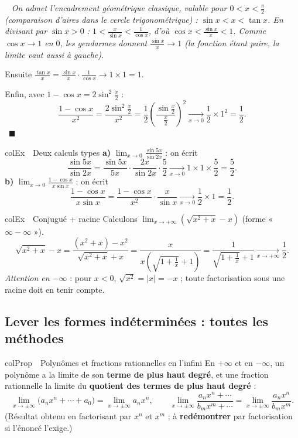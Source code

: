 \documentclass[11pt,a4paper]{article}
\newenvironment{propriete}[1][Propriété]
  {\begin{fiche}{colProp}{\ding{72}~~#1}}{\end{fiche}}
\newenvironment{exemple}[1][Exemple]
  {\begin{fiche}{colEx}{\ding{217}~~#1}}{\end{fiche}}
\newenvironment{demo}
  {\par\smallskip\noindent{\sffamily\bfseries\color{qtealdark}Démonstration.}\ \itshape}
  {\ \normalfont\hfill$\blacksquare$\par\medskip}
\begin{document}
\begin{demo}
On admet l'encadrement géométrique classique, valable pour $0 < x < \frac{\pi}{2}$ (comparaison d'aires dans le cercle trigonométrique) : $\sin x < x < \tan x$. En divisant par $\sin x > 0$ : $1 < \frac{x}{\sin x} < \frac{1}{\cos x}$, d'où $\cos x < \frac{\sin x}{x} < 1$. Comme $\cos x \to 1$ en $0$, les gendarmes donnent $\frac{\sin x}{x} \to 1$ (la fonction étant paire, la limite vaut aussi à gauche).

Ensuite $\frac{\tan x}{x} = \frac{\sin x}{x} \cdot \frac{1}{\cos x} \to 1 \times 1 = 1$.

Enfin, avec $1 - \cos x = 2\sin^2\frac{x}{2}$ :
\[
  \frac{1 - \cos x}{x^2} = \frac{2\sin^2\frac{x}{2}}{x^2}
  = \frac{1}{2}\left(\frac{\sin\frac{x}{2}}{\frac{x}{2}}\right)^{\!2}
  \xrightarrow[x \to 0]{} \frac{1}{2} \times 1^2 = \frac{1}{2}.
\]
\end{demo}

\begin{exemple}[Deux calculs types]
\textbf{a)} $\displaystyle\lim_{x \to 0} \frac{\sin 5x}{\sin 2x}$ : on écrit
\[
  \frac{\sin 5x}{\sin 2x}
  = \frac{\sin 5x}{5x} \cdot \frac{2x}{\sin 2x} \cdot \frac{5}{2}
  \xrightarrow[x \to 0]{} 1 \times 1 \times \frac{5}{2} = \frac{5}{2}.
\]
\textbf{b)} $\displaystyle\lim_{x \to 0} \frac{1 - \cos x}{x \sin x}$ : on écrit
\[
  \frac{1 - \cos x}{x \sin x}
  = \frac{1 - \cos x}{x^2} \cdot \frac{x}{\sin x}
  \xrightarrow[x \to 0]{} \frac{1}{2} \times 1 = \frac{1}{2}.
\]
\end{exemple}

\begin{exemple}[Conjugué + racine]
Calculons $\displaystyle\lim_{x \to +\infty} \left(\sqrt{x^2 + x} - x\right)$ (forme « $\infty - \infty$ »).
\[
  \sqrt{x^2 + x} - x
  = \frac{(x^2 + x) - x^2}{\sqrt{x^2 + x} + x}
  = \frac{x}{x\left(\sqrt{1 + \frac{1}{x}} + 1\right)}
  = \frac{1}{\sqrt{1 + \frac{1}{x}} + 1}
  \xrightarrow[x \to +\infty]{} \frac{1}{2}.
\]
\emph{Attention en $-\infty$} : pour $x < 0$, $\sqrt{x^2} = |x| = -x$ ; toute factorisation sous une racine doit en tenir compte.
\end{exemple}

\subsection{Lever les formes indéterminées : toutes les méthodes}

\begin{propriete}[Polynômes et fractions rationnelles en l'infini]
En $+\infty$ et en $-\infty$, un polynôme a la limite de son \textbf{terme de plus haut degré}, et une fraction rationnelle la limite du \textbf{quotient des termes de plus haut degré} :
\[
  \lim_{x \to \pm\infty} \bigl(a_n x^n + \cdots + a_0\bigr) = \lim_{x \to \pm\infty} a_n x^n,
  \qquad
  \lim_{x \to \pm\infty} \frac{a_n x^n + \cdots}{b_m x^m + \cdots} = \lim_{x \to \pm\infty} \frac{a_n x^n}{b_m x^m}.
\]
(Résultat obtenu en factorisant par $x^n$ et $x^m$ ; à \textbf{redémontrer} par factorisation si l'énoncé l'exige.)
\end{propriete}
\end{document}

